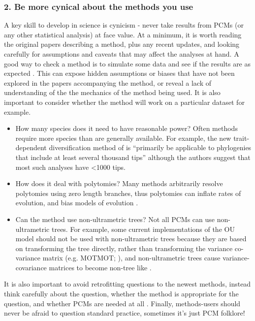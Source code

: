 \documentclass[a4paper,12pt]{article}
\begin{document}
  \subsubsection{2. Be more cynical about the methods you use}
    A key skill to develop in science is cynicism - never take results from PCMs (or any other statistical analysis) at face value.
    At a minimum, it is worth reading the original papers describing a method, plus any recent updates, and looking carefully for assumptions and caveats that may affect the analyses at hand.
    A good way to check a method is to simulate some data and see if the results are as expected \citep[e.g.][]{boettiger2012your}. 
    This can expose hidden assumptions or biases that have not been explored in the papers accompanying the method, or reveal a lack of understanding of the the mechanics of the method being used. 
    It is also important to consider whether the method will work on a particular dataset for example.
    \begin{itemize}
      \item How many species does it need to have reasonable power? 
      Often methods require more species than are generally available. 
      For example, the new trait-dependent diversification method of \citet{rabosky2015robust} is ``primarily be applicable to phylogenies that include at least several thousand tips'' although the authors suggest that most such analyses have \textless 1000 tips.
      \item How does it deal with polytomies?
      Many methods arbitrarily resolve polytomies using zero length branches, thus polytomies can inflate rates of evolution, and bias models of evolution \citep{cooper2010body}.
      \item Can the method use non-ultrametric trees? 
      Not all PCMs can use non-ultrametric trees. 
      For example, some current implementations of the OU model should not be used with non-ultrametric trees because they are based on transforming the tree directly, rather than transforming the variance co-variance matrix (e.g. MOTMOT; \citealp{Thomas:2011aa}), and non-ultrametric trees cause variance-covariance matrices to become non-tree like \citep{slater2014correction}. 
    \end{itemize}
    It is also important to avoid retrofitting questions to the newest methods, instead think carefully about the question, whether the method is appropriate for the question, and whether PCMs are needed at all \citep{losos2011seeing}.
    Finally, methods-users should never be afraid to question standard practice, sometimes it's just PCM folklore!
\end{document}
